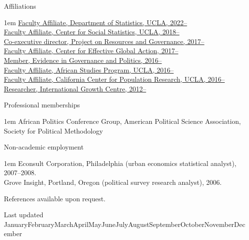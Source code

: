 \documentclass[10.9pt]{article}
\makeatletter
\newcommand\donotbreakhere{\par\nobreak\@afterheading\vspace{1em}}
\def\monthname{\ifcase\month\or January\or February\or March\or April\or May\or June\or July\or August\or September\or October\or November\or December \fi}
\newcommand{\complete}{1}
\newenvironment{indnt}{\begin{adjustwidth}{1em}{}}{\end{adjustwidth}}
\makeatother
\begin{document}
{\large  Affiliations} \donotbreakhere
\begin{indnt}
\href{https://css.ucla.edu}{Faculty Affiliate, Department of Statistics, UCLA, 2022--} \\[.75em]
\href{https://css.ucla.edu}{Faculty Affiliate, Center for Social Statistics, UCLA, 2018--} \\[.75em]
\href{http://projectrg.org}{Co-executive director, Project on Resources and Governance, 2017--} \\[.75em]   
\href{http://cega.berkeley.edu}{Faculty Affiliate, Center for Effective Global Action, 2017--} \\[.75em]   
\href{http://egap.org}{Member,  Evidence in Governance and Politics, 2016--} \\[.75em]
\href{http://www.international.ucla.edu/institute/academics/africanstudies/}{Faculty Affiliate, African Studies Program, UCLA, 2016--} \\[.75em]
\href{http://ccpr.ucla.edu}{Faculty Affiliate, California Center for Population Research, UCLA, 2016--} \\[.75em]
\href{http://theigc.org}{Researcher, International Growth Centre, 2012--} 
\end{indnt}
\vspace{1.5em}

{\large Professional memberships} \donotbreakhere
\begin{indnt}
African Politics Conference Group, %
American Political Science Association, Society for Political Methodology %
\end{indnt}
\vspace{1.5em}


{\large Non-academic employment} \donotbreakhere
\begin{indnt}
Econsult Corporation, Philadelphia (urban economics statistical analyst), 2007--2008.\\[.75em]
Grove Insight, Portland, Oregon (political survey research analyst), 2006.
\end{indnt}
\vspace{1em}

\vspace{1em}References available upon request.


\begin{center}
{\scriptsize  Last updated \monthname\ \the\year }
\end{center}
\end{document}
